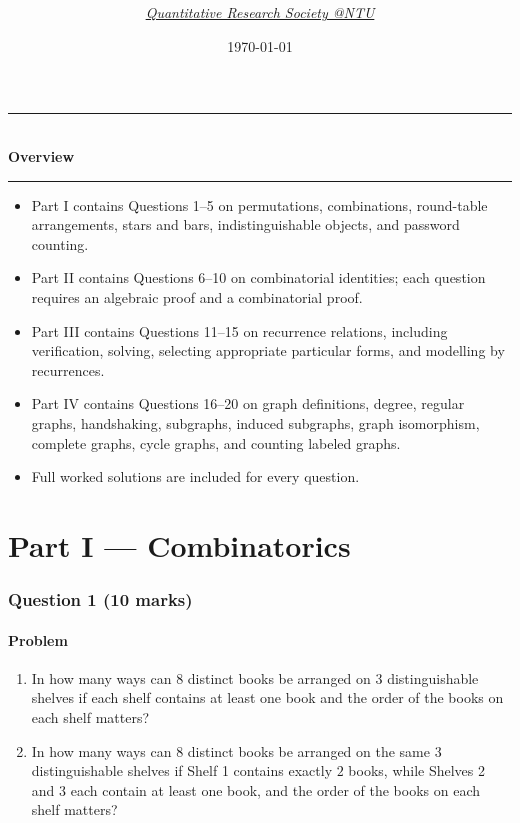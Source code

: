 \documentclass[12pt]{article}
\title{
\Huge \CourseCode\ \CourseName \\[0.3em]
\Large \DocType  \\[0.3em]
\ExamMeta
}
\author{
  \textit{\href{https://qrsntu.org}{Quantitative Research Society @NTU}}
}
\date{\today}
\newenvironment{overview}{
  \par\bigskip
  \begin{center}
    \rule{0.92\linewidth}{0.6pt}\\[-0.2em]
    \textbf{Overview}\\[-0.2em]
    \rule{0.92\linewidth}{0.6pt}
  \end{center}
  \vspace{-0.3em}
  \begin{itemize}[leftmargin=1.6em, itemsep=0.2em, topsep=0.2em]
}{
  \end{itemize}
  \par\bigskip
}
\begin{document}
\maketitle
\thispagestyle{plainfirst}
\pagestyle{main}

\begin{overview}
    \item Part I contains Questions 1--5 on permutations, combinations, round-table arrangements, stars and bars, indistinguishable objects, and password counting.
    \item Part II contains Questions 6--10 on combinatorial identities; each question requires an algebraic proof and a combinatorial proof.
    \item Part III contains Questions 11--15 on recurrence relations, including verification, solving, selecting appropriate particular forms, and modelling by recurrences.
    \item Part IV contains Questions 16--20 on graph definitions, degree, regular graphs, handshaking, subgraphs, induced subgraphs, graph isomorphism, complete graphs, cycle graphs, and counting labeled graphs.
    \item Full worked solutions are included for every question.
\end{overview}

\newpage
\tableofcontents


\newpage
\part{Part  I --- Combinatorics}
\section{Question 1 \hfill (10 marks)}
\subsection{Problem}

\begin{enumerate}[label=(\alph*)]
    \item In how many ways can $8$ distinct books be arranged on $3$ distinguishable shelves if each shelf contains at least one book and the order of the books on each shelf matters?
    \item In how many ways can $8$ distinct books be arranged on the same $3$ distinguishable shelves if Shelf 1 contains exactly $2$ books, while Shelves 2 and 3 each contain at least one book, and the order of the books on each shelf matters?
\end{enumerate}
\end{document}
